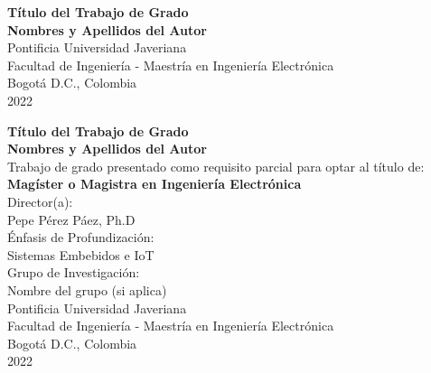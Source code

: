 \begin{center}
\begin{figure}
\centering%
%
\end{figure}
\thispagestyle{empty} \vspace*{1.0cm} \textbf{\huge
Título del Trabajo de Grado}\\[2.5cm]
\Large\textbf{Nombres y Apellidos del Autor}\\[2.5cm]
\small Pontificia Universidad Javeriana\\
Facultad de Ingeniería - Maestría en Ingeniería Electrónica\\
Bogotá D.C., Colombia\\
2022\\
\end{center}


\newpage
\begin{center}
\thispagestyle{empty} \vspace*{0cm} \textbf{\huge
Título del Trabajo de Grado}\\[2.5cm]
\Large\textbf{Nombres y Apellidos del Autor}\\[2.5cm]
\small Trabajo de grado presentado como requisito parcial para optar al título de:\\
\textbf{Magíster o Magistra en Ingeniería Electrónica}\\[2.0cm]
Director(a):\\
Pepe Pérez Páez, Ph.D\\[2.0cm]
Énfasis de Profundización:\\
Sistemas Embebidos e IoT\\ %
Grupo de Investigación:\\
Nombre del grupo (si aplica)\\[1.5cm]
Pontificia Universidad Javeriana\\
Facultad de Ingeniería - Maestría en Ingeniería Electrónica\\
Bogotá D.C., Colombia\\
2022\\
\end{center}

